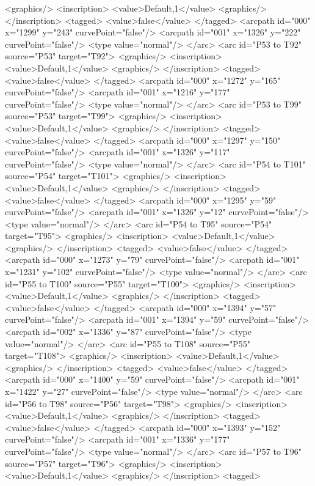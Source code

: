 <graphics/>
<inscription>
<value>Default,1</value>
<graphics/>
</inscription>
<tagged>
<value>false</value>
</tagged>
<arcpath id="000" x="1299" y="243" curvePoint="false"/>
<arcpath id="001" x="1326" y="222" curvePoint="false"/>
<type value="normal"/>
</arc>
<arc id="P53 to T92" source="P53" target="T92">
<graphics/>
<inscription>
<value>Default,1</value>
<graphics/>
</inscription>
<tagged>
<value>false</value>
</tagged>
<arcpath id="000" x="1272" y="165" curvePoint="false"/>
<arcpath id="001" x="1216" y="177" curvePoint="false"/>
<type value="normal"/>
</arc>
<arc id="P53 to T99" source="P53" target="T99">
<graphics/>
<inscription>
<value>Default,1</value>
<graphics/>
</inscription>
<tagged>
<value>false</value>
</tagged>
<arcpath id="000" x="1297" y="150" curvePoint="false"/>
<arcpath id="001" x="1326" y="117" curvePoint="false"/>
<type value="normal"/>
</arc>
<arc id="P54 to T101" source="P54" target="T101">
<graphics/>
<inscription>
<value>Default,1</value>
<graphics/>
</inscription>
<tagged>
<value>false</value>
</tagged>
<arcpath id="000" x="1295" y="59" curvePoint="false"/>
<arcpath id="001" x="1326" y="12" curvePoint="false"/>
<type value="normal"/>
</arc>
<arc id="P54 to T95" source="P54" target="T95">
<graphics/>
<inscription>
<value>Default,1</value>
<graphics/>
</inscription>
<tagged>
<value>false</value>
</tagged>
<arcpath id="000" x="1273" y="79" curvePoint="false"/>
<arcpath id="001" x="1231" y="102" curvePoint="false"/>
<type value="normal"/>
</arc>
<arc id="P55 to T100" source="P55" target="T100">
<graphics/>
<inscription>
<value>Default,1</value>
<graphics/>
</inscription>
<tagged>
<value>false</value>
</tagged>
<arcpath id="000" x="1394" y="57" curvePoint="false"/>
<arcpath id="001" x="1394" y="59" curvePoint="false"/>
<arcpath id="002" x="1336" y="87" curvePoint="false"/>
<type value="normal"/>
</arc>
<arc id="P55 to T108" source="P55" target="T108">
<graphics/>
<inscription>
<value>Default,1</value>
<graphics/>
</inscription>
<tagged>
<value>false</value>
</tagged>
<arcpath id="000" x="1400" y="59" curvePoint="false"/>
<arcpath id="001" x="1422" y="27" curvePoint="false"/>
<type value="normal"/>
</arc>
<arc id="P56 to T98" source="P56" target="T98">
<graphics/>
<inscription>
<value>Default,1</value>
<graphics/>
</inscription>
<tagged>
<value>false</value>
</tagged>
<arcpath id="000" x="1393" y="152" curvePoint="false"/>
<arcpath id="001" x="1336" y="177" curvePoint="false"/>
<type value="normal"/>
</arc>
<arc id="P57 to T96" source="P57" target="T96">
<graphics/>
<inscription>
<value>Default,1</value>
<graphics/>
</inscription>
<tagged>
